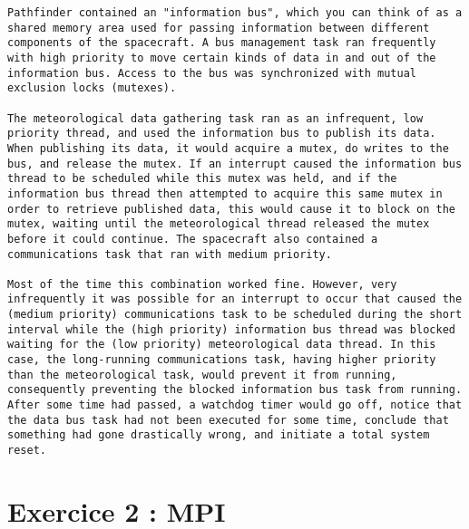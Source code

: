 \documentclass[a4paper]{article}
\begin{document}
\begin{lstlisting}[frame=single, breaklines=true, basicstyle=\footnotesize]
Pathfinder contained an "information bus", which you can think of as a shared memory area used for passing information between different components of the spacecraft. A bus management task ran frequently with high priority to move certain kinds of data in and out of the information bus. Access to the bus was synchronized with mutual exclusion locks (mutexes).

The meteorological data gathering task ran as an infrequent, low priority thread, and used the information bus to publish its data. When publishing its data, it would acquire a mutex, do writes to the bus, and release the mutex. If an interrupt caused the information bus thread to be scheduled while this mutex was held, and if the information bus thread then attempted to acquire this same mutex in order to retrieve published data, this would cause it to block on the mutex, waiting until the meteorological thread released the mutex before it could continue. The spacecraft also contained a communications task that ran with medium priority.

Most of the time this combination worked fine. However, very infrequently it was possible for an interrupt to occur that caused the (medium priority) communications task to be scheduled during the short interval while the (high priority) information bus thread was blocked waiting for the (low priority) meteorological data thread. In this case, the long-running communications task, having higher priority than the meteorological task, would prevent it from running, consequently preventing the blocked information bus task from running. After some time had passed, a watchdog timer would go off, notice that the data bus task had not been executed for some time, conclude that something had gone drastically wrong, and initiate a total system reset.
\end{lstlisting}

\section{Exercice 2 : MPI}
\end{document}

